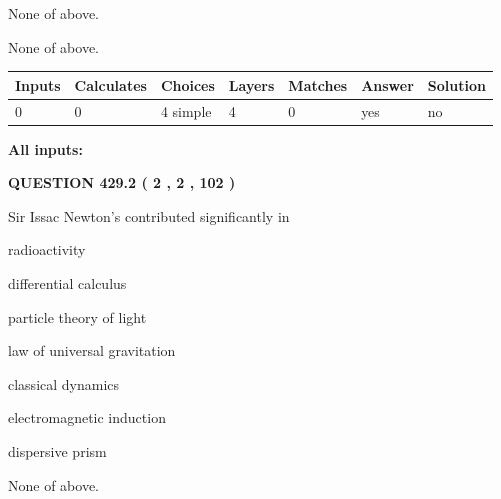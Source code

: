 \documentclass[12pt]{article}
\begin{document}
 
 None of above.
 
 
\noindent{}
 
 
 None of above.
 
 
\noindent{}
 
 
   
   
   
   
\noindent\begin{tabular}{|l|l|l|l|l|l|l|}
 \hline
Inputs & Calculates & Choices & Layers & Matches & Answer & Solution \\ \hline
 0  & 
 0  & 
 4
  simple  
  & 
 4  & 
 0  & 
  yes & 
  no 
  \\ \hline
 \end{tabular}
   
   
   
   
\noindent{}
   
   
   
   
\noindent\vspace{0.1in}\hspace{-0.08in} {\textbf{\Large{All inputs: }}}
   
   
  
\vspace{0.2in}
  
{\textbf{\Large{QUESTION
429.2 
 ( 2 , 2 , 102 )
}}}
  
  
Sir Issac Newton's contributed significantly in
 
 
radioactivity
 
 
differential calculus
 
 
particle theory of light
 
 
law of universal gravitation
 
 
classical dynamics
 
 
electromagnetic induction
 
 
dispersive prism
 
 
 None of above.
 
 
\noindent{}
 
\end{document}
